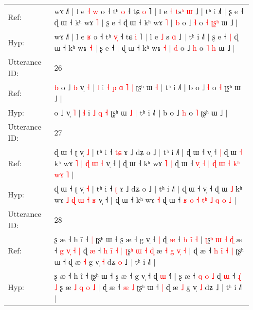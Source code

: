 \documentclass[10pt]{article}
\DeclareRobustCommand{\hl}[1]{{\textcolor{red}{#1}}}
\begin{document}
\begin{longtable}{ll}
Ref: & wɤ ˩˥ | l e\hl{ }\hl{˧} \hl{w} o ˧ tʰ \hl{}\hl{o} ˧ tɕ \hl{o} ˥ | l e \hl{˧} \hl{t}s\hl{ʰ} \hl{ɯ} ˩ | tʰ i ˩˥ | ʂ e ˧\hl{}\hl{} ɖ ɯ ˧ kʰ wɤ \hl{˥} | ʂ e ˧\hl{}\hl{} ɖ ɯ ˧ kʰ wɤ \hl{˥} | \hl{b} o ˩ \hl{ɬ} o \hl{˧} \hl{ʈ}\hl{ʂ}\hl{ʰ} ɯ ˩ |
 \\
Hyp: & wɤ ˩˥ | l e\hl{}\hl{} \hl{ʁ} o ˧ tʰ \hl{v}\hl{̩} ˧ tɕ \hl{i} ˥ | l e \hl{˩} \hl{}s\hl{} \hl{ɑ} ˩ | tʰ i ˩˥ | ʂ e ˧\hl{ }\hl{|} ɖ ɯ ˧ kʰ wɤ \hl{˧} | ʂ e ˧\hl{ }\hl{|} ɖ ɯ ˧ kʰ wɤ \hl{˧} | \hl{d} o ˩ \hl{h} o \hl{˥} \hl{}\hl{}\hl{h} ɯ ˩ |
 \\
\midrule
Utterance ID: & 26 \\
Ref: & \hl{b}\hl{ }o ˩\hl{ }\hl{b} v̩ \hl{˧} | \hl{l} i\hl{ }\hl{˧}\hl{ }\hl{p} \hl{ɑ} \hl{˥} \hl{|} ʈʂʰ ɯ \hl{˧} | tʰ i ˩˥ | b o ˩ \hl{ɬ} o \hl{˧} ʈʂʰ ɯ ˩ |
 \\
Hyp: & \hl{}\hl{}o ˩\hl{}\hl{} v̩ \hl{˥} | \hl{ɬ} i\hl{}\hl{}\hl{}\hl{} \hl{˩} \hl{q} \hl{˧} ʈʂʰ ɯ \hl{˩} | tʰ i ˩˥ | b o ˩ \hl{h} o \hl{˥} ʈʂʰ ɯ ˩ |
 \\
\midrule
Utterance ID: & 27 \\
Ref: & ɖ ɯ ˧ ʈ v̩ \hl{˩} | tʰ i ˧ \hl{t}\hl{ɕ} ɤ ˩ dʑ o ˩ | tʰ i ˩˥ | ɖ ɯ ˧ v̩ ˧\hl{ }\hl{|} ɖ ɯ \hl{˧} kʰ wɤ \hl{˥} \hl{|} \hl{ɖ} \hl{ɯ} \hl{˧} v̩ ˧ | ɖ ɯ ˧ kʰ wɤ\hl{ }\hl{˥} \hl{|} ɖ ɯ ˧ \hl{v}\hl{̩} \hl{˧} \hl{|} \hl{ɖ}\hl{ }\hl{ɯ} \hl{˧} \hl{k}\hl{ʰ} \hl{w}\hl{ɤ} \hl{˥} |
 \\
Hyp: & ɖ ɯ ˧ ʈ v̩ \hl{˧} | tʰ i ˧ \hl{}\hl{ʈ} ɤ ˩ dʑ o ˩ | tʰ i ˩˥ | ɖ ɯ ˧ v̩ ˧\hl{}\hl{} ɖ ɯ \hl{˩} kʰ wɤ \hl{˩} \hl{ɖ} \hl{ɯ} \hl{˧} \hl{ʁ} v̩ ˧ | ɖ ɯ ˧ kʰ wɤ\hl{}\hl{} \hl{˧} ɖ ɯ ˧ \hl{}\hl{ʁ} \hl{o} \hl{˧} \hl{}\hl{t}\hl{ʰ} \hl{˩} \hl{}\hl{q} \hl{}\hl{o} \hl{˩} |
 \\
\midrule
Utterance ID: & 28 \\
Ref: & ʂ æ ˧ h ĩ ˧\hl{ }\hl{|} ʈʂʰ ɯ ˧ ʂ æ ˧ g v̩ ˧\hl{ }\hl{|} ɖ \hl{æ} ˧\hl{ }\hl{h}\hl{ }\hl{i}\hl{̃}\hl{ }\hl{˧} | \hl{ʈ}ʂ\hl{ʰ}\hl{ }\hl{ɯ}\hl{ }\hl{˧}\hl{ }\hl{ɖ} æ ˧\hl{ }\hl{g} \hl{v}\hl{̩} \hl{˧} \hl{|} ɖ \hl{æ} ˧\hl{ }\hl{h} \hl{i}\hl{̃}\hl{ }\hl{˧} \hl{|} \hl{ʈ}ʂ\hl{ʰ}\hl{ }\hl{ɯ}\hl{ }\hl{˧}\hl{ }\hl{ɖ} æ \hl{˧} \hl{g} \hl{v}\hl{̩} \hl{˧} | ɖ æ ˧\hl{ }\hl{h}\hl{ }\hl{i}\hl{̃} \hl{˧} \hl{|} ʈʂʰ ɯ ˧\hl{}\hl{} ɖ æ \hl{˧} g v̩ \hl{˧} dʑ\hl{ }\hl{o} ˩ | tʰ i ˩˥ |
 \\
Hyp: & ʂ æ ˧ h ĩ ˧\hl{}\hl{} ʈʂʰ ɯ ˧ ʂ æ ˧ g v̩ ˧\hl{}\hl{} ɖ \hl{ɯ} ˧\hl{}\hl{}\hl{}\hl{}\hl{}\hl{}\hl{˥} | \hl{}ʂ\hl{}\hl{}\hl{}\hl{}\hl{}\hl{}\hl{} æ ˧\hl{}\hl{} \hl{}\hl{q} \hl{o} \hl{˩} ɖ \hl{ɯ} ˧\hl{}\hl{} \hl{}\hl{}\hl{ɻ}\hl{̍} \hl{˩} \hl{}ʂ\hl{}\hl{}\hl{}\hl{}\hl{}\hl{}\hl{} æ \hl{˩} \hl{q} \hl{}\hl{o} \hl{˩} | ɖ æ ˧\hl{}\hl{}\hl{}\hl{}\hl{} \hl{æ} \hl{˩} ʈʂʰ ɯ ˧\hl{ }\hl{|} ɖ æ \hl{˩} g v̩ \hl{˩} dʑ\hl{}\hl{} ˩ | tʰ i ˩˥ |

\end{longtable}
\end{document}
